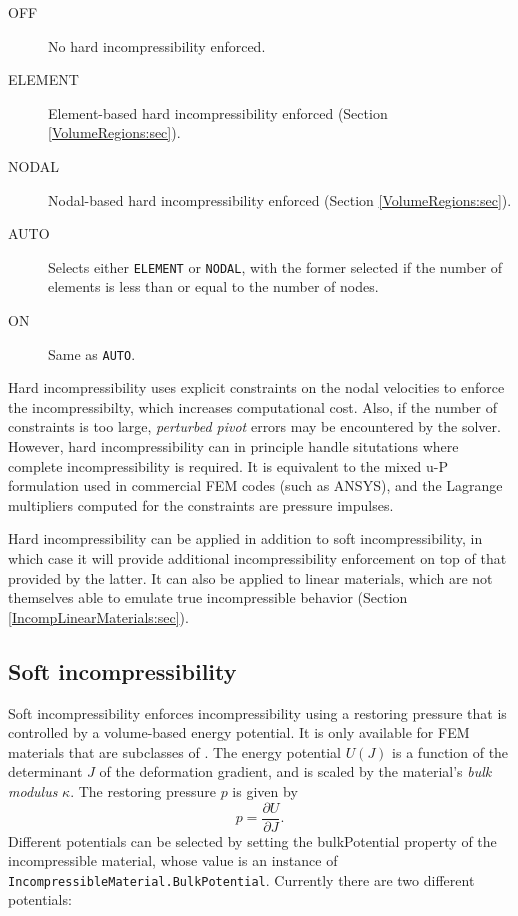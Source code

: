 \begin{description}

\item[OFF] No hard incompressibility enforced.

\item[ELEMENT] Element-based hard incompressibility enforced
(Section \ref{VolumeRegions:sec}).

\item[NODAL] Nodal-based hard incompressibility enforced
(Section \ref{VolumeRegions:sec}).

\item[AUTO] Selects either {\tt ELEMENT} or {\tt NODAL},
with the former selected if the number of elements is less than or
equal to the number of nodes.

\item[ON] Same as {\tt AUTO}.

\end{description}

Hard incompressibility uses explicit constraints on the nodal
velocities to enforce the incompressibilty, which increases
computational cost. Also, if the number of constraints is too large,
{\it perturbed pivot} errors may be encountered by the solver.
However, hard incompressibility can in principle handle situtations
where complete incompressibility is required. It is equivalent to the
mixed u-P formulation used in commercial FEM codes (such as ANSYS),
and the Lagrange multipliers computed for the constraints are pressure
impulses.

Hard incompressibility can be applied in addition to soft
incompressibility, in which case it will provide additional
incompressibility enforcement on top of that provided by the latter.
It can also be applied to linear materials, which are not themselves
able to emulate true incompressible behavior
(Section \ref{IncompLinearMaterials:sec}).

\subsection{Soft incompressibility}
\label{SoftIncomp:sec}

Soft incompressibility enforces incompressibility using a restoring
pressure that is controlled by a volume-based energy potential. It is
only available for FEM materials that are subclasses of
.
The energy potential $U(J)$ is a function of the determinant $J$ of the
deformation gradient, and is scaled by the material's {\it bulk modulus}
$\kappa$. The restoring pressure $p$ is given by
%
\begin{equation}
p = \frac{\partial U}{\partial J}.
\end{equation}
%
Different potentials can be selected by setting the {\sf bulkPotential}
property of the incompressible material, whose value is an instance of
{\tt IncompressibleMaterial.BulkPotential}.  Currently
there are two different potentials:

